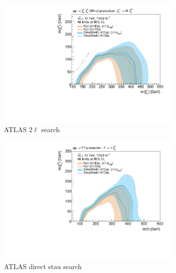\begin{figure}
	\par\medskip
	\begin{subfigure}[b]{0.5\textwidth}
		\centering\includegraphics[width=\textwidth]{exclusion_2L0J_noLabel_v2}
		\caption{ATLAS $2\ell$ search~\cite{SUSY-2018-32}\label{fig:results_2L0J}}
	\end{subfigure}\hfill
	\begin{subfigure}[b]{0.5\textwidth}
		\centering\includegraphics[width=\textwidth]{exclusion_directstaus_noLabel_v2}
		\caption{ATLAS direct stau search~\cite{SUSY-2018-04}\label{fig:results_directstaus}}
	\end{subfigure}\hfill
	\par\medskip
	\begin{subfigure}[b]{0.5\textwidth}

\end{subfigure}
\end{figure}
